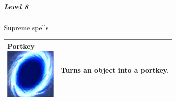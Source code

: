 \subparagraph{Level 8} 
Supreme spells \\
\begin{tabular}{ p{3cm}p{14cm} } \hline
	\specialcell[p]{\textbf{Portkey}         \\ \includegraphics[width=2.5cm]{../Pictures/Gameplay/Spells/Icon/Portkey_spell_icon.png}}         & Turns an object into a portkey. \\ \hline
\end{tabular}

\pagebreak
